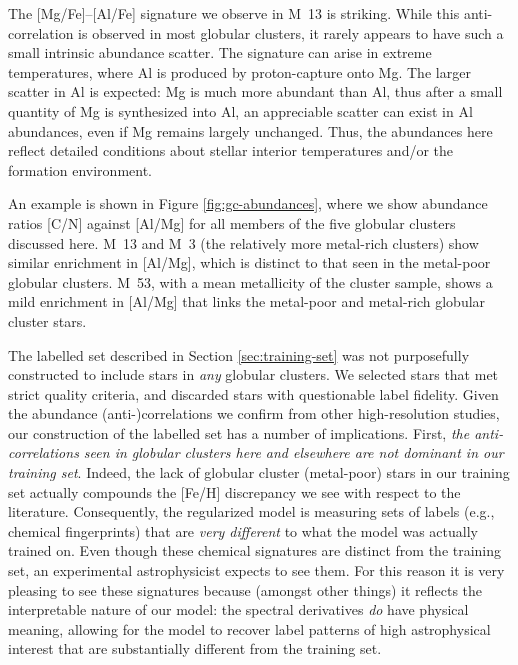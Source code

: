 \documentclass[12pt,preprint]{aastex}
\begin{document}
The [Mg/Fe]--[Al/Fe] signature we observe in M~13 is striking.  While this
anti-correlation is observed in most globular clusters, it rarely 
appears to have such a small intrinsic abundance scatter.  The signature
can arise in extreme temperatures, where Al is produced by proton-capture
onto Mg. The larger scatter in Al is expected: Mg is much more abundant 
than Al, thus after a small quantity of Mg is synthesized into Al, an 
appreciable scatter can exist in Al abundances, even if Mg remains largely
unchanged.  Thus, the abundances here reflect detailed conditions about
stellar interior temperatures and/or the formation environment.  

An example
is shown in Figure \ref{fig:gc-abundances}, where we show abundance
ratios [C/N] against [Al/Mg] for all members of the five globular clusters
discussed here.  M~13 and M~3 (the relatively more metal-rich clusters) 
show similar enrichment in [Al/Mg], which is distinct to that seen in 
the metal-poor globular clusters.  M~53, with a mean metallicity of the 
cluster sample, shows a mild enrichment in [Al/Mg] that links the metal-poor
and metal-rich globular cluster stars.




The labelled set described in Section \ref{sec:training-set} was not
purposefully constructed to include stars in \emph{any} globular
clusters.  We selected stars that met strict quality criteria, and
discarded stars with questionable label fidelity.  Given the
abundance (anti-)correlations we confirm from other high-resolution
studies, our construction of the labelled set has a number of
implications.  First, \emph{the anti-correlations seen in globular 
clusters here and elsewhere are not dominant in our training set}.
Indeed, the lack of globular cluster (metal-poor) stars in our 
training set actually compounds the [Fe/H] discrepancy we see with
respect to the literature.  Consequently, the regularized model is 
measuring sets of labels (e.g., chemical fingerprints) that are 
\emph{very different} to what the model was actually trained on.  
Even though these chemical signatures are distinct from the training
set, an experimental astrophysicist expects to see them.  For this
reason it is very pleasing to see these signatures because (amongst
other things) it reflects the interpretable nature of our model: the spectral
derivatives \emph{do} have physical meaning, allowing for the model
to recover label patterns of high astrophysical interest that are 
substantially different from the training set.
\end{document}
